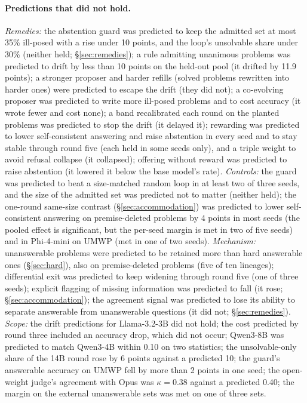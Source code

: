 \paragraph{Predictions that did not hold.} \emph{Remedies:} the abstention guard was predicted to keep the admitted set at most 35\% ill-posed with a rise under 10 points, and the loop's unsolvable share under 30\% (neither held; \S\ref{sec:remedies}); a rule admitting unanimous problems was predicted to drift by less than 10 points on the held-out pool (it drifted by 11.9 points); a stronger proposer and harder refills (solved problems rewritten into harder ones) were predicted to escape the drift (they did not); a co-evolving proposer was predicted to write more ill-posed problems and to cost accuracy (it wrote fewer and cost none); a band recalibrated each round on the planted problems was predicted to stop the drift (it delayed it); rewarding \unk{} was predicted to lower self-consistent answering and raise abstention in every seed and to stay stable through round five (each held in some seeds only), and a triple weight to avoid refusal collapse (it collapsed); offering \unk{} without reward was predicted to raise abstention (it lowered it below the base model's rate). \emph{Controls:} the guard was predicted to beat a size-matched random loop in at least two of three seeds, and the size of the admitted set was predicted not to matter (neither held); the one-round same-size contrast (\S\ref{sec:accommodation}) was predicted to lower self-consistent answering on premise-deleted problems by 4 points in most seeds (the pooled effect is significant, but the per-seed margin is met in two of five seeds) and in Phi-4-mini on UMWP (met in one of two seeds). \emph{Mechanism:} unanswerable problems were predicted to be retained more than hard answerable ones (\S\ref{sec:hard}), also on premise-deleted problems (five of ten lineages); differential exit was predicted to keep widening through round five (one of three seeds); explicit flagging of missing information was predicted to fall (it rose; \S\ref{sec:accommodation}); the agreement signal was predicted to lose its ability to separate answerable from unanswerable questions (it did not; \S\ref{sec:remedies}). \emph{Scope:} the drift predictions for Llama-3.2-3B did not hold; the cost predicted by round three included an accuracy drop, which did not occur; Qwen3-8B was predicted to match Qwen3-4B within 0.10 on two statistics; the unsolvable-only share of the 14B round rose by 6 points against a predicted 10; the guard's answerable accuracy on UMWP fell by more than 2 points in one seed; the open-weight judge's agreement with Opus was $\kappa{=}0.38$ against a predicted 0.40; the margin on the external unanswerable sets was met on one of three sets.


